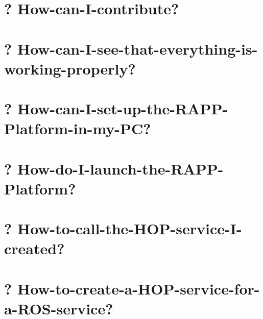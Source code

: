\documentclass[twoside]{book}
\begin{document}
\chapter{? How-\/can-\/\-I-\/contribute?}
\label{md_rapp-platform_8wiki_How-can-I-contribute}
\hypertarget{md_rapp-platform_8wiki_How-can-I-contribute}{}

\chapter{? How-\/can-\/\-I-\/see-\/that-\/everything-\/is-\/working-\/properly?}
\label{md_rapp-platform_8wiki_How-can-I-see-that-everything-is-working-properly}
\hypertarget{md_rapp-platform_8wiki_How-can-I-see-that-everything-is-working-properly}{}

\chapter{? How-\/can-\/\-I-\/set-\/up-\/the-\/\-R\-A\-P\-P-\/\-Platform-\/in-\/my-\/\-P\-C?}
\label{md_rapp-platform_8wiki_How-can-I-set-up-the-RAPP-Platform-in-my-PC}
\hypertarget{md_rapp-platform_8wiki_How-can-I-set-up-the-RAPP-Platform-in-my-PC}{}

\chapter{? How-\/do-\/\-I-\/launch-\/the-\/\-R\-A\-P\-P-\/\-Platform?}
\label{md_rapp-platform_8wiki_How-do-I-launch-the-RAPP-Platform}
\hypertarget{md_rapp-platform_8wiki_How-do-I-launch-the-RAPP-Platform}{}

\chapter{? How-\/to-\/call-\/the-\/\-H\-O\-P-\/service-\/\-I-\/created?}
\label{md_rapp-platform_8wiki_How-to-call-the-HOP-service-I-created}
\hypertarget{md_rapp-platform_8wiki_How-to-call-the-HOP-service-I-created}{}

\chapter{? How-\/to-\/create-\/a-\/\-H\-O\-P-\/service-\/for-\/a-\/\-R\-O\-S-\/service?}
\label{md_rapp-platform_8wiki_How-to-create-a-HOP-service-for-a-ROS-service}
\hypertarget{md_rapp-platform_8wiki_How-to-create-a-HOP-service-for-a-ROS-service}{}

\end{document}
